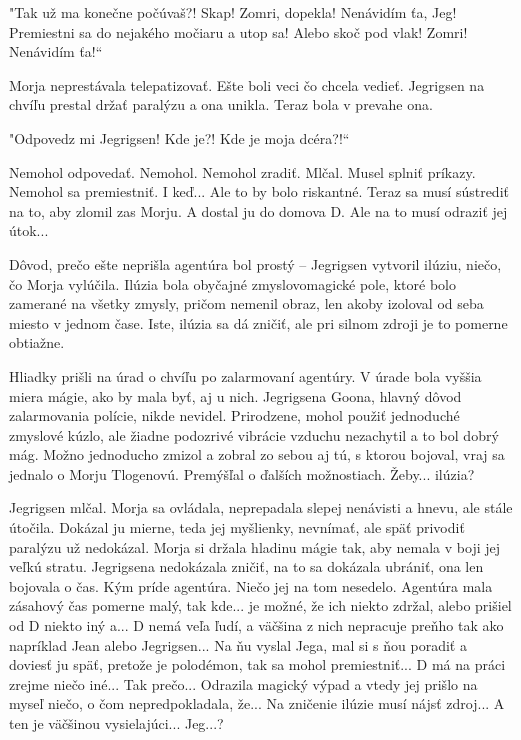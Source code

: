 \documentclass{book}
\begin{document}
"$ $Tak už ma konečne počúvaš?! Skap! Zomri, dopekla! Nenávidím ťa, Jeg! Premiestni sa do nejakého močiaru a utop sa! Alebo skoč pod vlak! Zomri! Nenávidím ťa!“

Morja neprestávala telepatizovať. Ešte boli veci čo chcela vedieť. Jegrigsen na chvíľu prestal držať paralýzu a ona unikla. Teraz bola v prevahe ona.

"$ $Odpovedz mi Jegrigsen! Kde je?! Kde je moja dcéra?!“

Nemohol odpovedať. Nemohol. Nemohol zradiť. Mlčal. Musel splniť príkazy. Nemohol sa premiestniť. I keď... Ale to by bolo riskantné. Teraz sa musí sústrediť na to, aby zlomil zas Morju. A dostal ju do domova D. Ale na to musí odraziť jej útok...

Dôvod, prečo ešte neprišla agentúra bol prostý – Jegrigsen vytvoril ilúziu, niečo, čo Morja vylúčila. Ilúzia bola obyčajné zmyslovomagické pole, ktoré bolo zamerané na všetky zmysly, pričom nemenil obraz, len akoby izoloval od seba miesto v jednom čase. Iste, ilúzia sa dá zničiť, ale pri silnom zdroji je to pomerne obtiažne.

Hliadky prišli na úrad o chvíľu po zalarmovaní agentúry. V úrade bola vyššia miera mágie, ako by mala byť, aj u nich. Jegrigsena Goona, hlavný dôvod zalarmovania polície, nikde nevidel. Prirodzene, mohol použiť jednoduché zmyslové kúzlo, ale žiadne podozrivé vibrácie vzduchu nezachytil a to bol dobrý mág. Možno jednoducho zmizol a zobral zo sebou aj tú, s ktorou bojoval, vraj sa jednalo o Morju Tlogenovú. Premýšľal o ďalších možnostiach. Žeby... ilúzia?

Jegrigsen mlčal. Morja sa ovládala, neprepadala slepej nenávisti a hnevu, ale stále útočila. Dokázal ju mierne, teda jej myšlienky, nevnímať, ale späť privodiť paralýzu už nedokázal. Morja si držala hladinu mágie tak, aby nemala v boji jej veľkú stratu. Jegrigsena nedokázala zničiť, na to sa dokázala ubrániť, ona len bojovala o čas. Kým príde agentúra. Niečo jej na tom nesedelo. Agentúra mala zásahový čas pomerne malý, tak kde... je možné, že ich niekto zdržal, alebo prišiel od D niekto iný a... D nemá veľa ľudí, a väčšina z nich nepracuje preňho tak ako napríklad Jean alebo Jegrigsen... Na ňu vyslal Jega, mal si s ňou poradiť a doviesť ju späť, pretože je polodémon, tak sa mohol premiestniť... D má na práci zrejme niečo iné... Tak prečo... Odrazila magický výpad a vtedy jej prišlo na myseľ niečo, o čom nepredpokladala, že... Na zničenie ilúzie musí nájsť zdroj... A ten je väčšinou vysielajúci... Jeg...?
\end{document}
